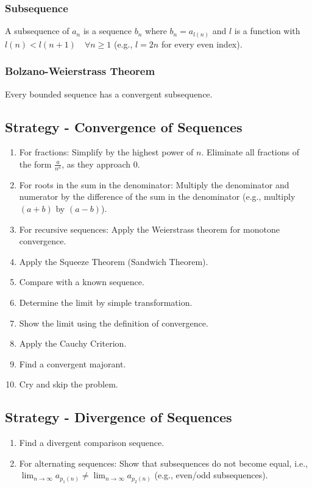 \subsubsection{Subsequence}
A subsequence of \(a_n\) is a sequence \(b_n\) where \(b_n = a_{l(n)}\) and \(l\) is a function with \(l(n) < l(n+1) \quad \forall n \ge 1\) (e.g., \(l = 2n\) for every even index).

\subsubsection{Bolzano-Weierstrass Theorem}
Every bounded sequence has a convergent subsequence.

\subsection{Strategy - Convergence of Sequences}
\begin{enumerate}
 \item For fractions: Simplify by the highest power of \(n\). Eliminate all fractions of the form \( \frac{a}{n^a} \), as they approach 0.
 \item For roots in the sum in the denominator: Multiply the denominator and numerator by the difference of the sum in the denominator (e.g., multiply \((a+b)\) by \((a-b)\)).
 \item For recursive sequences: Apply the Weierstrass theorem for monotone convergence.
 \item Apply the Squeeze Theorem (Sandwich Theorem).
 \item Compare with a known sequence.
 \item Determine the limit by simple transformation.
 \item Show the limit using the definition of convergence.
 \item Apply the Cauchy Criterion.
 \item Find a convergent majorant.
 \item Cry and skip the problem.
\end{enumerate}

\subsection{Strategy - Divergence of Sequences}
\begin{enumerate}
 \item Find a divergent comparison sequence.
 \item For alternating sequences: Show that subsequences do not become equal, i.e., \( \lim_{n \to \infty} a_{p_1(n)} \ne \lim_{n \to \infty} a_{p_2(n)} \) (e.g., even/odd subsequences).
\end{enumerate}

